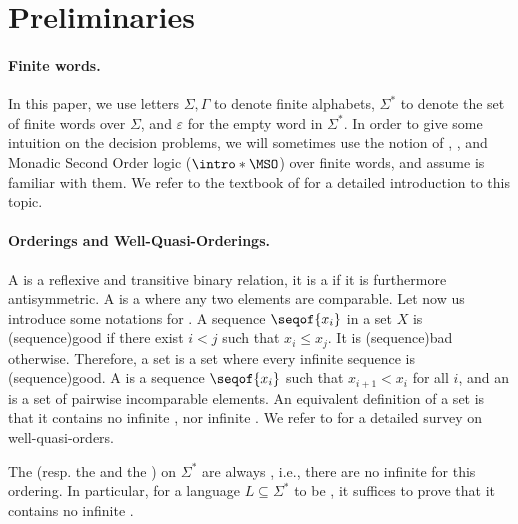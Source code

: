 \section{Preliminaries}
\label{prelims:sec}

\paragraph*{Finite words.} In this paper, we use letters $\Sigma, \Gamma$ to
denote finite alphabets, $\Sigma^*$ to denote the set of finite words over
$\Sigma$, and $\varepsilon$ for the empty word in $\Sigma^*$. In order to give
some intuition on the decision problems, we will sometimes use the notion of
, , and Monadic Second Order
logic ($\intro*\MSO$) over finite words, and assume is familiar with them. We
refer to the textbook of \cite{THOM97} for a detailed introduction to this
topic.


\paragraph*{Orderings and Well-Quasi-Orderings.} A  is a
reflexive and transitive binary relation, it is a  if it
is furthermore antisymmetric. A  is a 
where any two elements are comparable. Let now us introduce some notations for
. A sequence $\seqof{x_i}$ in a set $X$ is
\intro(sequence){good} if there exist $i < j$ such that $x_i \leq x_j$. It is
\intro(sequence){bad} otherwise. Therefore, a  set is a
set where every infinite sequence is \kl(sequence){good}. A  is a sequence $\seqof{x_i}$ such that $x_{i+1} < x_i$ for all $i$,
and an  is a set of pairwise incomparable elements. An
equivalent definition of a  set is that it contains no
infinite , nor infinite . We refer to
\cite{SCSC12} for a detailed survey on well-quasi-orders.

The  (resp. the  and the ) on $\Sigma^*$ are always , i.e., there are no
infinite  for this ordering. In particular, for a
language $L \subseteq \Sigma^*$ to be , it suffices to
prove that it contains no infinite . 

